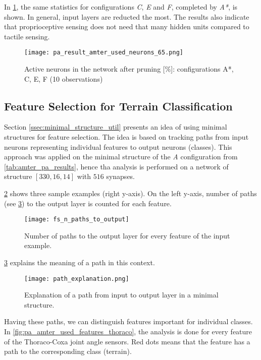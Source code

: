 In \cref{fig:pa_amter_used_neurons_65}, the same statistics for configurations \textit{C}, \textit{E} and \textit{F}, completed by \textit{A*}, is shown. In general, input layers are reducted the most. The results also indicate that proprioceptive sensing does not need that many hidden units compared to tactile sensing.

\begin{figure}[H]
  \centering
  \texttt{[image: pa\_result\_amter\_used\_neurons\_65.png]}
  \caption{Active neurons in the network after pruning [\%]: configurations A*, C, E, F (10 observations)}
  \label{fig:pa_amter_used_neurons_65}
\end{figure}

\subsection{Feature Selection for Terrain Classification} \label{ssec:pa_amter_feature_selection}
Section \ref{ssec:minimal_structure_util} presents an idea of using minimal structures for feature selection. The idea is based on tracking paths from input neurons representing individual features to output neurons (classes). This approach was applied on the minimal structure of the \textit{A} configuration from \cref{tab:amter_pa_results}, hence tha analysis is performed on a network of structure $ [330, 16, 14] $ with $ 516 $ synapses.

\cref{fig:pa_amter_n_paths_to_output} shows three sample examples (right y-axis). On the left y-axis, number of paths (see \cref{img:path_explanation}) to the output layer is counted for each feature.

\begin{figure}[H]
  \centering
  \texttt{[image: fs\_n\_paths\_to\_output]}
  \caption{Number of paths to the output layer for every feature of the input example.}
  \label{fig:pa_amter_n_paths_to_output}
\end{figure}

\cref{img:path_explanation} explains the meaning of a path in this context.

\begin{figure}[H]
  \centering
  \texttt{[image: path\_explanation.png]}
  \caption{Explanation of a path from input to output layer in a minimal structure.}
  \label{img:path_explanation}
\end{figure}

Having these paths, we can distinguish features important for individual classes. In \cref{fig:pa_amter_used_features_thoraco}, the analysis is done for every feature of the Thoraco-Coxa joint angle sensors. Red dots means that the feature has a path to the corresponding class (terrain).

